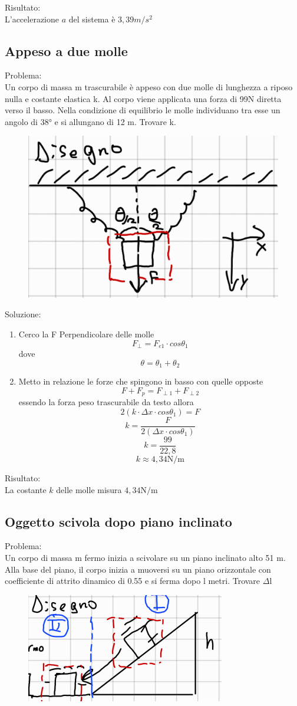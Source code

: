 \documentclass{article}
\begin{document}
\noindent Risultato:\\
L'accelerazione \(a\) del sistema è \(3,39 m/s^2\)
\subsection{Appeso a due molle}
Problema:\\
Un corpo di massa m trascurabile è appeso con due molle di lunghezza a riposo nulla e costante elastica k. Al corpo viene applicata una forza di 99N diretta verso il basso. Nella condizione di equilibrio le molle individuano tra esse un angolo di 38° e si allungano di 12 m. Trovare k.
\begin{figure}[ht]
    \centering
    \includegraphics[width=0.5\linewidth]{Immagini/appesotraduemolle.png}
\end{figure}

\noindent Soluzione:
\begin{enumerate}
    \item Cerco la F Perpendicolare delle molle
    \[ F_\perp = F_{e1} \cdot cos \theta_1\]
    dove
    \[\theta = \theta_1 + \theta_2\]
    \item Metto in relazione le forze che spingono in basso con quelle opposte
    \[F + F_p = F_{\perp1} + F_{\perp2}\]
    essendo la forza peso trascurabile da testo allora
    \[2(k\cdot \Delta x \cdot cos\theta_1) = F\]
    \[k = \frac{F}{2(\Delta x \cdot cos\theta_1)}\]
    \[k =  \frac{99}{22,8}\]
    \[k \approx 4,34 \text{N/m}\]
\end{enumerate}

\noindent Risultato:\\
La costante \(k\) delle molle misura \(4,34 \text{N/m}\)
\newpage
\subsection{Oggetto scivola dopo piano inclinato}
Problema:\\
Un corpo di massa m fermo inizia a scivolare su un piano inclinato alto 51 m. Alla base del piano, il corpo inizia a muoversi su un piano orizzontale con coefficiente di attrito dinamico di 0.55 e si ferma dopo l metri. Trovare \(\Delta\)l
\begin{figure}[ht]
    \centering
    \includegraphics[width=0.5\linewidth]{Immagini/oggettoscivolapianoinclinatoesiferma.png}
\end{figure}
\end{document}
